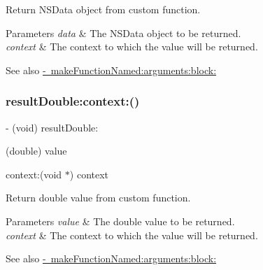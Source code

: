 Return {\ttfamily N\+S\+Data} object from custom function.


\begin{DoxyParams}{Parameters}
{\em data} & The {\ttfamily N\+S\+Data} object to be returned. \\
\hline
{\em context} & The context to which the value will be returned.\\
\hline
\end{DoxyParams}
\begin{DoxySeeAlso}{See also}
\mbox{\hyperlink{interface_o_p_t_l_y_f_m_d_b_database_af2c3e10041c8d0a95e2feb84a2ffa645}{-\/ make\+Function\+Named\+:arguments\+:block\+:}} 
\end{DoxySeeAlso}
\mbox{\label{interface_o_p_t_l_y_f_m_d_b_database_ac039575b6d5bc656bb54eeb6f88d71e6}} 
\subsubsection{\texorpdfstring{result\+Double\+:context\+:()}{resultDouble:context:()}}
{\footnotesize\ttfamily -\/ (void) result\+Double\+: \begin{DoxyParamCaption}\item[{(double)}]{value }\item[{context:(void $\ast$)}]{context }\end{DoxyParamCaption}}

Return double value from custom function.


\begin{DoxyParams}{Parameters}
{\em value} & The double value to be returned. \\
\hline
{\em context} & The context to which the value will be returned.\\
\hline
\end{DoxyParams}
\begin{DoxySeeAlso}{See also}
\mbox{\hyperlink{interface_o_p_t_l_y_f_m_d_b_database_af2c3e10041c8d0a95e2feb84a2ffa645}{-\/ make\+Function\+Named\+:arguments\+:block\+:}} 
\end{DoxySeeAlso}
\mbox{\label{interface_o_p_t_l_y_f_m_d_b_database_aef8ca2bd4709a1411f10757daec353cf}} 

